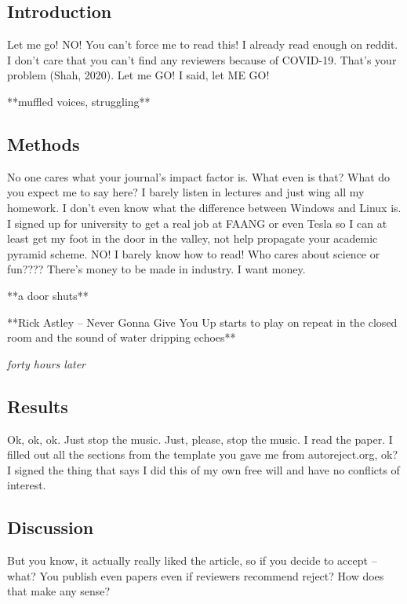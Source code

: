 \documentclass[12pt]{sigbovik-review}
\author{Maya Harris, undergraduate student.}
\begin{document}
\maketitle

\subsection{Introduction}
Let me go! NO! You can't force me to read this! I already read enough on reddit. I don't care that you can't find any reviewers because of COVID-19. That's your problem (Shah, 2020). Let me GO! I said, let ME GO!

**muffled voices, struggling**

\subsection{Methods}
No one cares what your journal's impact factor is. What even is that? What do you expect me to say here? I barely listen in lectures and just wing all my homework. I don't even know what the difference between Windows and Linux is. I signed up for university to get a real job at FAANG or even Tesla so I can at least get my foot in the door in the valley, not help propagate your academic pyramid scheme. NO! I barely know how to read! Who cares about science or fun???? There's money to be made in industry. I want money.

**a door shuts**

**Rick Astley -- Never Gonna Give You Up starts to play on repeat in the closed room and the sound of water dripping echoes**

\textit{forty hours later}

\subsection{Results}
Ok, ok, ok. Just stop the music. Just, please, stop the music. I read the paper. I filled out all the sections from the template you gave me from autoreject.org, ok? I signed the thing that says I did this of my own free will and have no conflicts of interest.

\subsection{Discussion}
But you know, it actually really liked the article, so if you decide to accept -- what? You publish even papers even if reviewers recommend reject? How does that make any sense?
\end{document}
